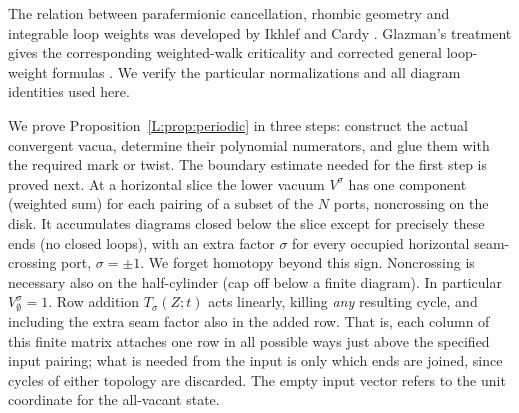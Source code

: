 The relation between parafermionic cancellation, rhombic geometry and
integrable loop weights was developed by Ikhlef and Cardy
\cite{IkhlefCardy2009}. Glazman's treatment gives the corresponding
weighted-walk criticality and corrected general loop-weight formulas
\cite[Theorems~1.1--1.2 and Section~5]{Glazman2015}. We verify the particular normalizations and
all diagram identities used here.

We prove Proposition~\ref{L:prop:periodic} in three steps: construct the actual convergent vacua, determine their polynomial numerators, and glue them with the required mark or twist. The boundary estimate needed for the first step is proved next. At a horizontal slice the lower vacuum \(V^\sigma\) has one component (weighted sum) for each pairing of a subset of the \(N\) ports, noncrossing on the disk. It accumulates diagrams closed below the slice except for precisely these ends (no closed loops), with an extra factor \(\sigma\) for every occupied horizontal seam-crossing port, \(\sigma=\pm1\). We forget homotopy beyond this sign. Noncrossing is necessary also on the half-cylinder (cap off below a finite diagram). In particular \(V^\sigma_\emptyset=1\). Row addition \(T_\sigma(Z;t)\) acts linearly, killing \emph{any} resulting cycle, and including the extra seam factor also in the added row. That is, each column of this finite matrix attaches one row in all possible ways just above the specified input pairing; what is needed from the input is only which ends are joined, since cycles of either topology are discarded. The empty input vector refers to the unit coordinate for the all-vacant state.

